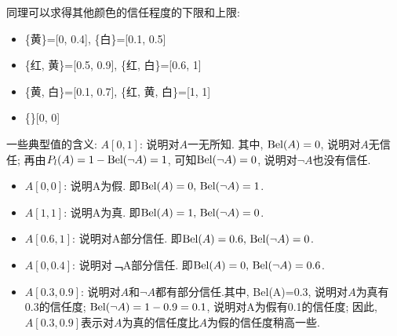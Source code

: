 同理可以求得其他颜色的信任程度的下限和上限:
\begin{itemize}
    \item \{黄\}=[0, 0.4],         \quad         \{白\}=[0.1,  0.5]
    \item \{红, 黄\}=[0.5,  0.9],  \quad         \{红, 白\}=[0.6,  1]
    \item \{黄, 白\}=[0.1,  0.7],  \quad         \{红, 黄, 白\}=[1, 1]
    \item \{\}[0,  0]
\end{itemize}

一些典型值的含义: $A[0,1]$: 说明对$A$一无所知.
其中, $\textup{Bel}(A)=0$, 说明对$A$无信任;
再由$P_l(A)=1-\textup{Bel}(\neg A)=1$, 可知$\textup{Bel}(\neg A)=0$, 说明对$\neg A$也没有信任.
\begin{itemize}
\item $A[0, 0]$: 说明A为假. 即$\textup{Bel}(A)=0,\, \textup{Bel}(\neg A)=1$.
\item $A[1, 1]$: 说明A为真. 即$\textup{Bel}(A)=1,\, \textup{Bel}(\neg A)=0$.
\item $A[0.6,1]$: 说明对A部分信任. 即$\textup{Bel}(A)=0.6,\, \textup{Bel}(\neg A)=0$.
\item $A[0, 0.4]$: 说明对﹁A部分信任. 即$\textup{Bel}(A)=0,\, \textup{Bel}(\neg A)=0.6$.
\item $A[0.3, 0.9]$: 说明对$A$和$\neg A$都有部分信任.其中, \textup{Bel}(A)=0.3, 说明对$A$为真有0.3的信任度;
        $\textup{Bel}(\neg  A)=1-0.9=0.1$, 说明对A为假有0.1的信任度;
因此, $A[0.3, 0.9]$表示对$A$为真的信任度比$A$为假的信任度稍高一些.
\end{itemize}


